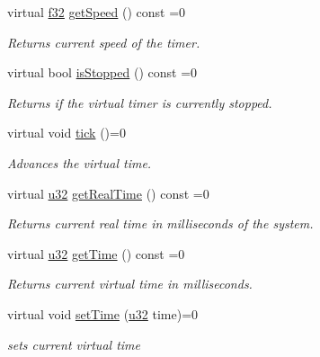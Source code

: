 \begin{DoxyCompactItemize}
virtual \hyperlink{namespaceirr_a0277be98d67dc26ff93b1a6a1d086b07}{f32} \hyperlink{classirr_1_1ITimer_ac2b3c1947d78e5bb9dc62f32edc4e1b2}{get\+Speed} () const =0
\begin{DoxyCompactList}\small\item\em Returns current speed of the timer. \end{DoxyCompactList}\item 
\mbox{\label{classirr_1_1ITimer_ac868245b9562f0c13b2e0ce127c48532}} 
virtual bool \hyperlink{classirr_1_1ITimer_ac868245b9562f0c13b2e0ce127c48532}{is\+Stopped} () const =0
\begin{DoxyCompactList}\small\item\em Returns if the virtual timer is currently stopped. \end{DoxyCompactList}\item 
virtual void \hyperlink{classirr_1_1ITimer_a50ee793711cace4410e1f9c9e1ce20c6}{tick} ()=0
\begin{DoxyCompactList}\small\item\em Advances the virtual time. \end{DoxyCompactList}\item 
virtual \hyperlink{namespaceirr_a0416a53257075833e7002efd0a18e804}{u32} \hyperlink{classirr_1_1ITimer_a67d6b3ae61c2e6aaad82c4ae15ab55f1}{get\+Real\+Time} () const =0
\begin{DoxyCompactList}\small\item\em Returns current real time in milliseconds of the system. \end{DoxyCompactList}\item 
virtual \hyperlink{namespaceirr_a0416a53257075833e7002efd0a18e804}{u32} \hyperlink{classirr_1_1ITimer_aa2c53890268d6886b3b5bbf2af5dba9c}{get\+Time} () const =0
\begin{DoxyCompactList}\small\item\em Returns current virtual time in milliseconds. \end{DoxyCompactList}\item 
\mbox{\label{classirr_1_1ITimer_ae93bf312ccf87478565e080450291386}} 
virtual void \hyperlink{classirr_1_1ITimer_ae93bf312ccf87478565e080450291386}{set\+Time} (\hyperlink{namespaceirr_a0416a53257075833e7002efd0a18e804}{u32} time)=0
\begin{DoxyCompactList}\small\item\em sets current virtual time \end{DoxyCompactList}\item 

\end{DoxyCompactItemize}
